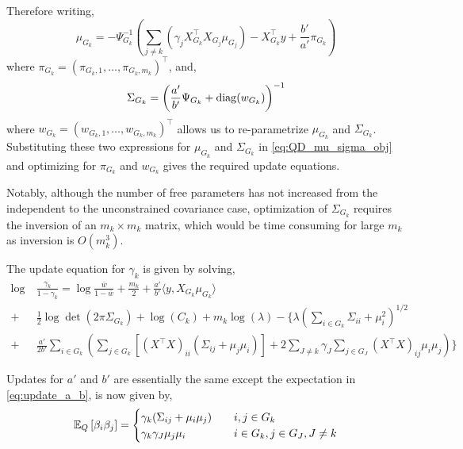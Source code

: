 Therefore writing, 
\begin{equation*}
    \mu_{G_k} = -\Psi_{G_k}^{-1} \left( \sum_{j \neq k} (\gamma_j X^\top_{G_k} X_{G_j} \mu_{G_j}) - X^\top_{G_k} y + \frac{b'}{a'} \pi_{G_k} \right)
\end{equation*}
where $\pi_{G_k} = (\pi_{G_k,1}, \dots, \pi_{G_k, m_k})^\top$, and,
\begin{equation*}
    \Sigma_{G_k} = \left( \frac{a'}{b'} \Psi_{G_k} + \operatorname{diag}(w_{G_k}) \right)^{-1}
\end{equation*}
where $w_{G_k} = (w_{G_k,1}, \dots, w_{G_k, m_k})^\top$ allows us to re-parametrize $\mu_{G_k}$ and $\Sigma_{G_k}$. Substituting these two expressions for $\mu_{G_k}$ and $\Sigma_{G_k}$ in \eqref{eq:QD_mu_sigma_obj} and optimizing for $\pi_{G_k}$ and $w_{G_k}$ gives the required update equations.

Notably, although the number of free parameters has not increased from the independent to the unconstrained covariance case, optimization of $\Sigma_{G_k}$ requires the inversion of an $m_k \times m_k$ matrix, which would be time consuming for large $m_k$ as inversion is $O(m_k^3)$.


The update equation for $\gamma_k$ is given by solving,
\begin{equation} \label{eq:QD_update_gamma} 
\begin{aligned}
    \log &\ \frac{\gamma_k}{1-\gamma_k} = 
    \log \frac{\bar{w}}{1-\bar{w}}
+ 
    \frac{m_k}{2}  
+
    \frac{a'}{b'} \langle y, X_{G_k} \mu_{G_k} \rangle  \\
+ &\ 
    \frac{1}{2} \log \det \left( 2 \pi \Sigma_{G_k} \right)
+
    \log(C_k )
+
    m_k \log (\lambda)
-
\Bigg\{ 
    \lambda \left( \sum_{i \in G_k} 
	\Sigma_{ii} + \mu_i^2
    \right)^{1/2}  \\
+ &\
    \frac{a'}{2 b'}
    \sum_{i \in G_k} \left( 
    \sum_{j \in G_k} \left[
	(X^\top X)_{ii} (\Sigma_{ij} + \mu_j \mu_i)
    \right]
+
    2 \sum_{J \neq k} \gamma_{J} \sum_{j \in G_J} (X^\top X)_{ij} 
	\mu_i \mu_j
    \right )
\Bigg\}
\end{aligned}
\end{equation}


Updates for $a'$ and $b'$ are essentially the same except the expectation in \eqref{eq:update_a_b}, is now given by,
\begin{equation}
    \mathbb{E}_{Q} \left[ \beta_i \beta_j \right] = \begin{cases}
	\gamma_k (\Sigma_{ij} + \mu_{i} \mu_{j}) & \quad i,j \in G_k \\
	\gamma_k \gamma_J \mu_{j}\mu_{i} 	 & \quad i \in G_k, j \in G_J, J \neq k
    \end{cases}
\end{equation}


